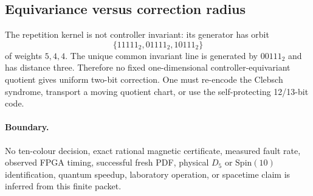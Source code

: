 \subsection{Equivariance versus correction radius}
The repetition kernel is not controller invariant: its generator has orbit
\[
 \{11111_2,01111_2,10111_2\}
\]
of weights \(5,4,4\).  The unique common invariant line is generated by
\(00111_2\) and has distance three.  Therefore no fixed one-dimensional
controller-equivariant quotient gives uniform two-bit correction.  One must
re-encode the Clebsch syndrome, transport a moving quotient chart, or use the
self-protecting 12/13-bit code.

\paragraph{Boundary.}
No ten-colour decision, exact rational magnetic certificate, measured fault
rate, observed FPGA timing, successful fresh PDF, physical \(D_5\) or
\(\mathrm{Spin}(10)\) identification, quantum speedup, laboratory operation, or
spacetime claim is inferred from this finite packet.
